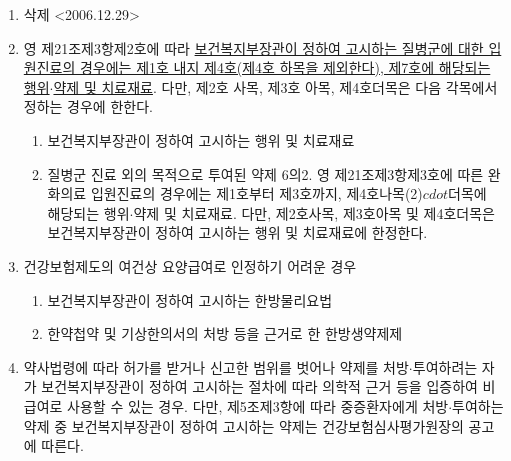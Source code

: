 \begin{enumerate}[1.]
\begin{enumerate}[더.]
	\end{enumerate}
\item 삭제 <2006.12.29>
\item 영 제21조제3항제2호에 따라 \uline{보건복지부장관이 정하여 고시하는 질병군에 대한 입원진료의 경우에는 제1호 내지 제4호(제4호 하목을 제외한다), 제7호에 해당되는 행위}$\cdot$\uline{약제 및 치료재료}. 다만, 제2호 사목, 제3호 아목, 제4호더목은 다음 각목에서 정하는 경우에 한한다.
	\begin{enumerate}[가.]\tightlist
	\item 보건복지부장관이 정하여 고시하는 행위 및 치료재료
	\item 질병군 진료 외의 목적으로 투여된 약제 6의2. 영 제21조제3항제3호에 따른 완화의료 입원진료의 경우에는 제1호부터 제3호까지, 제4호나목(2)$cdot$더목에 해당되는 행위$\cdot$약제 및 치료재료. 다만, 제2호사목, 제3호아목 및 제4호더목은 보건복지부장관이 정하여 고시하는 행위 및 치료재료에 한정한다.
	\end{enumerate}
\item 건강보험제도의 여건상 요양급여로 인정하기 어려운 경우
	\begin{enumerate}[가.]\tightlist
	\item 보건복지부장관이 정하여 고시하는 한방물리요법
	\item 한약첩약 및 기상한의서의 처방 등을 근거로 한 한방생약제제
	\end{enumerate}
\item 약사법령에 따라 허가를 받거나 신고한 범위를 벗어나 약제를 처방$\cdot$투여하려는 자가 보건복지부장관이 정하여 고시하는 절차에 따라 의학적 근거 등을 입증하여 비급여로 사용할 수 있는 경우. 다만, 제5조제3항에 따라 중증환자에게 처방$\cdot$투여하는 약제 중 보건복지부장관이 정하여 고시하는 약제는 건강보험심사평가원장의 공고에 따른다.
\end{enumerate}


